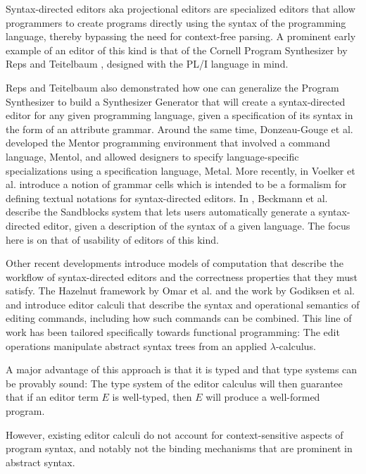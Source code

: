 \documentclass[sigplan,review]{acmart}
\begin{document}
Syntax-directed editors aka projectional editors are specialized
editors that allow programmers to create programs directly using the
syntax of the programming language, thereby bypassing the need for
context-free parsing. A prominent early example of an editor of this
kind is that of the Cornell Program Synthesizer by Reps and Teitelbaum
\cite{10.1145/358746.358755}, designed with the PL/I language in mind.

Reps and Teitelbaum also demonstrated \cite{10.1145/390010.808247} how
one can generalize the Program Synthesizer to build a Synthesizer
Generator that will create a syntax-directed editor for any given
programming language, given a specification of its syntax in the form
of an attribute grammar. Around the same time, Donzeau-Gouge et
al. developed the Mentor programming environment
\cite{10.5555/800054.801990} that involved a command language, Mentol,
and allowed designers to specify language-specific specializations
using a specification language, Metal. More recently, in
\cite{10.1145/2997364.2997365} Voelker et al. introduce a notion of
grammar cells which is intended to be a formalism for defining textual
notations for syntax-directed editors. In
\cite{10.1145/3544548.3580785}, Beckmann et al. describe the
Sandblocks system that lets users automatically generate a
syntax-directed editor, given a description of the syntax of a given
language. The focus here is on that of usability of editors of this
kind.

Other recent developments introduce models of computation that
describe the workflow of syntax-directed editors and the correctness
properties that they must satisfy. The Hazelnut framework by Omar et
al. \cite{hazelnut} and the work by Godiksen et al. and
\cite{type_safe_structure_editor} introduce editor calculi that
describe the syntax and operational semantics of editing commands,
including how such commands can be combined. This line of work has
been tailored specifically towards functional programming: The edit
operations manipulate abstract syntax trees from an applied
$\lambda$-calculus.

A major advantage of this approach is that it is typed and that type
systems can be provably sound: The type system of the editor calculus
will then guarantee that if an editor term $E$ is well-typed, then $E$
will produce a well-formed program.

However, existing editor calculi do not account for context-sensitive
aspects of program syntax, and notably not the binding
mechanisms that are prominent in abstract syntax.
\end{document}

